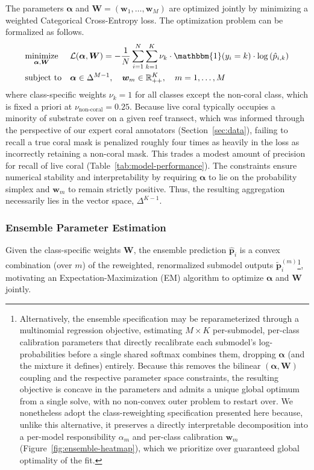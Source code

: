 \documentclass[11pt]{elsarticle}
\begin{document}
The parameters $\bm{\alpha}$ and $\bm{W} = (\bm{w}_1, \dots, \bm{w}_M)$ are optimized jointly by minimizing a weighted Categorical Cross-Entropy loss. The optimization problem can be formalized as follows.
\begin{equation} \label{eq:min_problem}
\begin{aligned}
& \underset{\bm{\alpha}, \bm{W}}{\text{minimize}}
& & \mathcal{L}(\bm{\alpha}, \bm{W}) = -\frac{1}{N} \sum_{i=1}^N \sum_{k=1}^K \nu_k \cdot \mathbbm{1}(y_i = k) \cdot \log\left( \hat{p}_{i,k} \right) \\
& \text{subject to}
& & \bm{\alpha} \in \Delta^{M-1}, \quad \bm{w}_m \in \mathbb{R}_{++}^K, \quad m = 1, \ldots, M
\end{aligned}
\end{equation}
where class-specific weights $\nu_k=1$ for all classes except the non-coral class, which is fixed a priori at $\nu_{\text{non-coral}} = 0.25$. Because live coral typically occupies a minority of substrate cover on a given reef transect, which was informed through the perspective of our expert coral annotators (Section~\ref{sec:data}), failing to recall a true coral mask is penalized roughly four times as heavily in the loss as incorrectly retaining a non-coral mask. This trades a modest amount of precision for recall of live coral (Table~\ref{tab:model-performance}). The constraints ensure numerical stability and interpretability by requiring $\bm{\alpha}$ to lie on the probability simplex and $\bm{w}_m$ to remain strictly positive. Thus, the resulting aggregation necessarily lies in the vector space, $\Delta^{K-1}$.

\subsubsection{Ensemble Parameter Estimation}
\label{sec:ensemble_est}
Given the class-specific weights $\bm{W}$, the ensemble prediction $\hat{\bm{p}}_i$ is a convex combination (over $m$) of the reweighted, renormalized submodel outputs $\tilde{\bm{p}}_i^{(m)}$\footnote{Alternatively, the ensemble specification may be reparameterized through a multinomial regression objective, estimating $M \times K$ per-submodel, per-class calibration parameters that directly recalibrate each submodel's log-probabilities before a single shared softmax combines them, dropping $\bm{\alpha}$ (and the mixture it defines) entirely. Because this removes the bilinear $(\bm{\alpha}, \bm{W})$ coupling and the respective parameter space constraints, the resulting objective is concave in the parameters and admits a unique global optimum from a single solve, with no non-convex outer problem to restart over. We nonetheless adopt the class-reweighting specification presented here because, unlike this alternative, it preserves a directly interpretable decomposition into a per-model responsibility $\alpha_m$ and per-class calibration $\bm{w}_m$ (Figure~\ref{fig:ensemble-heatmap}), which we prioritize over guaranteed global optimality of the fit.}, motivating an Expectation-Maximization (EM) algorithm to optimize $\bm{\alpha}$ and $\bm{W}$ jointly.
\end{document}
